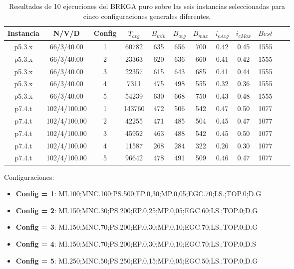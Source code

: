 \bigskip

\begin{table}
\begin{center}
\begin{tabular}{ |c|c|c|c|c|c|c|c|c|c|c|c|} 
\hline
Instancia & N/V/D & Config & $T_{avg}$ & $B_{min}$ & $B_{avg}$ & $B_{max}$ & $i_{eAvg}$ & $i_{eMax}$ & $Best$ \\
\hline
p5.3.x & 66/3/40.00 & 1 & 60782 & 635 & 656 & 700 & 0.42 & 0.45 & 1555  \\
p5.3.x & 66/3/40.00 & 2 & 23363 & 620 & 636 & 660 & 0.41 & 0.42 & 1555  \\
p5.3.x & 66/3/40.00 & 3 & 22357 & 615 & 643 & 685 & 0.41 & 0.44 & 1555  \\
p5.3.x & 66/3/40.00 & 4 & 7311 & 475 & 498 & 555 & 0.32 & 0.36 & 1555  \\
p5.3.x & 66/3/40.00 & 5 & 54239 & 630 & 668 & 750 & 0.43 & 0.48 & 1555  \\
p7.4.t & 102/4/100.00 & 1 & 143760 & 472 & 506 & 542 & 0.47 & 0.50 & 1077  \\
p7.4.t & 102/4/100.00 & 2 & 42255 & 471 & 485 & 504 & 0.45 & 0.47 & 1077  \\
p7.4.t & 102/4/100.00 & 3 & 45952 & 463 & 488 & 542 & 0.45 & 0.50 & 1077  \\
p7.4.t & 102/4/100.00 & 4 & 11587 & 268 & 284 & 322 & 0.26 & 0.30 & 1077  \\
p7.4.t & 102/4/100.00 & 5 & 96642 & 478 & 491 & 509 & 0.46 & 0.47 & 1077  \\
\hline
\end{tabular}
\end{center}
\caption{Resultados de 10 ejecuciones del BRKGA puro sobre las seis instancias seleccionadas para cinco configuraciones generales diferentes.}
\label{tab:resultadosBrkgaPuroCincoConfig}
\end{table}

\bigskip

Configuraciones: 
\begin{itemize}
  \item \textbf{Config = 1}: MI.100;MNC.100;PS.500;EP.0,30;MP.0,05;EGC.70;LS.;TOP.0;D.G
  \item \textbf{Config = 2}: MI.150;MNC.30;PS.200;EP.0,25;MP.0,05;EGC.60;LS.;TOP.0;D.G 
  \item \textbf{Config = 3}: MI.150;MNC.70;PS.200;EP.0,30;MP.0,10;EGC.70;LS.;TOP.0;D.G
  \item \textbf{Config = 4}: MI.150;MNC.70;PS.200;EP.0,30;MP.0,10;EGC.70;LS.;TOP.0;D.S
  \item \textbf{Config = 5}: MI.250;MNC.50;PS.250;EP.0,15;MP.0,05;EGC.50;LS.;TOP.0;D.G 
\end{itemize}

